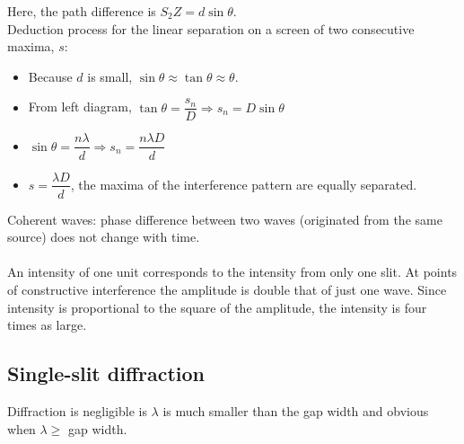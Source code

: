 \documentclass[a4paper,12pt]{article}
\begin{document}
Here, the path difference is $S_2Z=d\sin\theta$.\\
Deduction process for the linear separation on a screen of two consecutive maxima, $s$:
\begin{itemize}
  \item Because $d$ is small, $\sin\theta\approx\tan\theta\approx\theta$.
  \item From left diagram, $\tan\theta=\dfrac{s_n}{D}\Rightarrow s_n=D\sin\theta$
  \item $\sin\theta=\dfrac{n\lambda}{d}\Rightarrow s_n=\dfrac{n\lambda D}{d}$
  \item $s=\dfrac{\lambda D}{d}$, the maxima of the interference pattern are equally separated.
\end{itemize}
Coherent waves: phase difference between two waves (originated from the same source) does not change with time.\\\\
An intensity of one unit corresponds to the intensity from only one slit. At points of constructive interference the amplitude is double that of just one wave. Since intensity is proportional to the square of the amplitude, the intensity is four times as large.
\newpage
\subsection{Single-slit diffraction}
Diffraction is negligible is $\lambda$ is much smaller than the gap width and obvious when $\lambda\geq$ gap width.
\end{document}
